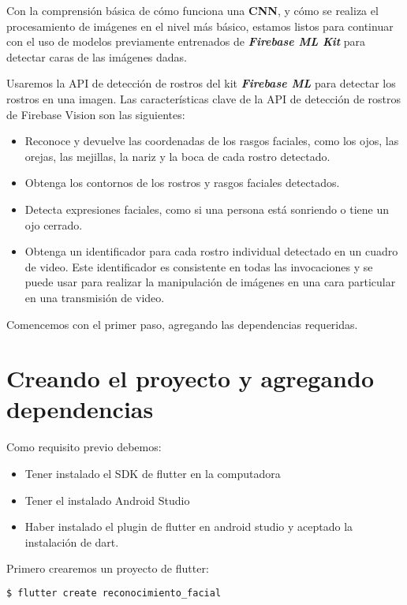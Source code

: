 Con la comprensión básica de cómo funciona una \textbf{CNN}, y cómo se realiza el procesamiento de imágenes en el nivel más básico, estamos listos para continuar con el uso de modelos previamente entrenados de \textbf{\textit{Firebase ML Kit}} para detectar caras de las imágenes dadas.

Usaremos la API de detección de rostros del kit \textbf{\textit{Firebase ML}} para detectar los rostros en una imagen. Las características clave de la API de detección de rostros de Firebase Vision son las siguientes:

\begin{itemize}
	\item Reconoce y devuelve las coordenadas de los rasgos faciales, como los ojos, las orejas, las mejillas, la nariz y la boca de cada rostro detectado.
	\item Obtenga los contornos de los rostros y rasgos faciales detectados.
	\item Detecta expresiones faciales, como si una persona está sonriendo o tiene un ojo cerrado.
	\item Obtenga un identificador para cada rostro individual detectado en un cuadro de video. Este identificador es consistente en todas las invocaciones y se puede usar para realizar la manipulación de imágenes en una cara particular en una transmisión de video.
\end{itemize}

Comencemos con el primer paso, agregando las dependencias requeridas.

\section{Creando el proyecto y agregando dependencias}

Como requisito previo debemos:

\begin{itemize}
	\item Tener instalado el SDK de  flutter en la computadora
	\item Tener el instalado Android Studio
	\item Haber instalado el plugin de flutter en android studio y aceptado la instalación de dart.
\end{itemize}

Primero crearemos un proyecto de flutter:

\begin{lstlisting}[language=bash]
	$ flutter create reconocimiento_facial
\end{lstlisting} 

